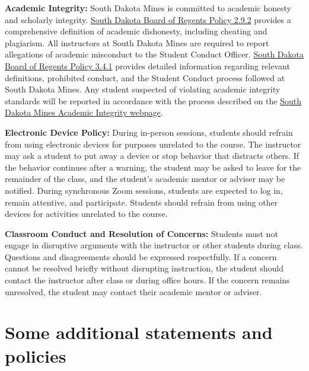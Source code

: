 \documentclass[12pt]{article}
\newcommand{\coursefield}[2]{%
  \vspace{0.2em}\noindent\textbf{#1} #2\par
}
\begin{document}
\coursefield{Academic Integrity:}{
South Dakota Mines is committed to academic honesty and scholarly integrity. \href{https://public.powerdms.com/SDRegents/documents/1587741}{South Dakota Board of Regents Policy 2.9.2} provides a comprehensive definition of academic dishonesty, including cheating and plagiarism. All instructors at South Dakota Mines are required to report allegations of academic misconduct to the Student Conduct Officer. \href{https://public.powerdms.com/SDRegents/documents/1680638}{South Dakota Board of Regents Policy 3.4.1} provides detailed information regarding relevant definitions, prohibited conduct, and the Student Conduct process followed at South Dakota Mines. Any student suspected of violating academic integrity standards will be reported in accordance with the process described on the \href{https://www.sdsmt.edu/i-am-a/academic-integrity.html}{South Dakota Mines Academic Integrity webpage}.
}

\coursefield{Electronic Device Policy:}{
During in-person sessions, students should refrain from using electronic devices for purposes unrelated to the course. The instructor may ask a student to put away a device or stop behavior that distracts others. If the behavior continues after a warning, the student may be asked to leave for the remainder of the class, and the student's academic mentor or adviser may be notified. During synchronous Zoom sessions, students are expected to log in, remain attentive, and participate. Students should refrain from using other devices for activities unrelated to the course.
}

\coursefield{Classroom Conduct and Resolution of Concerns:}{Students must not engage in disruptive arguments with the instructor or other students during class. Questions and disagreements should be expressed respectfully. If a concern cannot be resolved briefly without disrupting instruction, the student should contact the instructor after class or during office hours. If the concern remains unresolved, the student may contact their academic mentor or adviser.
}

\section{Some additional statements and policies}
\end{document}
